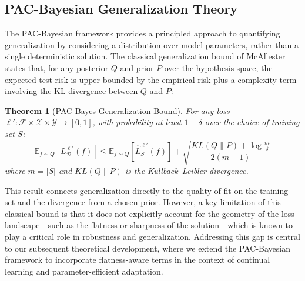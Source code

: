 \documentclass[letterpaper]{article} %
\newtheorem{theorem}{Theorem}
\begin{document}
\subsection{PAC-Bayesian Generalization Theory}

The PAC-Bayesian framework provides a principled approach to quantifying generalization by considering a distribution over model parameters, rather than a single deterministic solution. The classical generalization bound of McAllester~\citep{mcallesterPACBayesianStochasticModel2003} states that, for any posterior $Q$ and prior $P$ over the hypothesis space, the expected test risk is upper-bounded by the empirical risk plus a complexity term involving the KL divergence between $Q$ and $P$:


\begin{theorem}[PAC-Bayes Generalization Bound]
For any loss $\ell': \mathcal{F} \times \mathcal{X} \times \mathcal{Y} \to [0,1]$, with probability at least $1-\delta$ over the choice of training set $S$:
\begin{equation}
    \mathbb{E}_{f \sim Q}[L_{\mathcal{D}}^{\ell'}(f)] \leq \mathbb{E}_{f \sim Q}[\hat{L}_S^{\ell'}(f)] + \sqrt{\frac{KL(Q\|P) + \log \frac{m}{\delta}}{2(m-1)}}
\end{equation}
where $m = |S|$ and $KL(Q\|P)$ is the Kullback–Leibler divergence.
\end{theorem}

This result connects generalization directly to the quality of fit on the training set and the divergence from a chosen prior. However, a key limitation of this classical bound is that it does not explicitly account for the geometry of the loss landscape—such as the flatness or sharpness of the solution—which is known to play a critical role in robustness and generalization. Addressing this gap is central to our subsequent theoretical development, where we extend the PAC-Bayesian framework to incorporate flatness-aware terms in the context of continual learning and parameter-efficient adaptation.
\end{document}
